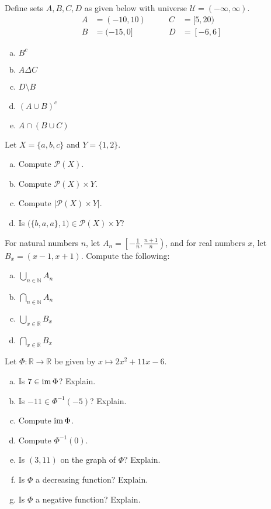 \documentclass[12pt,letterpaper]{exam}
\begin{document}
\begin{questions}
\newpage
\question[10] Define sets $A, B, C, D$ as given below with universe $\mathcal{U}= (-\infty, \infty)$. 
	\[
	\begin{aligned}
	A&= (-10, 10) \qquad& C&= [5, 20) \\[0.1cm]
	B&= (-15, 0] & D&= [-6, 6]
	\end{aligned}
	\]

\begin{enumerate}[(a)]
\item $B^c$
\item $A \Delta C$
\item $D \setminus B$
\item $(A \cup B)^c$
\item $A \cap (B \cup C)$
\end{enumerate}



\newpage
\question[10] Let $X= \{ a, b, c \}$ and $Y= \{ 1, 2 \}$. 
	\begin{enumerate}[(a)]
	\item Compute $\mathcal{P}(X)$.
	\item Compute $\mathcal{P}(X) \times Y$. 
	\item Compute $|\mathcal{P}(X) \times Y|$.
	\item Is $\big( \{ b, a, a \}, 1 \big) \in \mathcal{P}(X) \times Y$?
	\end{enumerate}



\newpage
\question[10] For natural numbers $n$, let $A_n= \left[ -\frac{1}{n}, \frac{n + 1}{n} \right)$, and for real numbers $x$, let $B_x= (x - 1, x + 1)$. Compute the following:
	\begin{enumerate}[(a)]
	\item $\displaystyle \bigcup_{n \in \mathbb{N}} A_n$
	\item $\displaystyle \bigcap_{n \in \mathbb{N}} A_n$
	\item $\displaystyle \bigcup_{x \in \mathbb{R}} B_x$
	\item $\displaystyle \bigcap_{x \in \mathbb{R}} B_x$
	\end{enumerate}



\newpage
\question[10] Let $\Phi \colon \mathbb{R} \to \mathbb{R}$ be given by $x \mapsto 2x^2 + 11x - 6$. 
	\begin{enumerate}[(a)]
	\item Is $7 \in \operatorname{im} \Phi$? Explain. 
	\item Is $-11 \in \Phi^{-1}(-5)$? Explain. 
	\item Compute $\operatorname{im} \Phi$.
	\item Compute $\Phi^{-1}(0)$. 
	\item Is $(3, 11)$ on the graph of $\Phi$? Explain. 
	\item Is $\Phi$ a decreasing function? Explain.  
	\item Is $\Phi$ a negative function? Explain. 
	\end{enumerate}


\end{questions}
\end{document}
